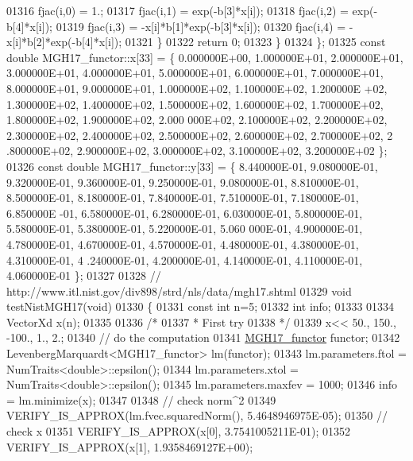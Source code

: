 \begin{DoxyCode}
01316             fjac(i,0) = 1.;
01317             fjac(i,1) = exp(-b[3]*x[i]);
01318             fjac(i,2) = exp(-b[4]*x[i]);
01319             fjac(i,3) = -x[i]*b[1]*exp(-b[3]*x[i]);
01320             fjac(i,4) = -x[i]*b[2]*exp(-b[4]*x[i]);
01321         \}
01322         \textcolor{keywordflow}{return} 0;
01323     \}
01324 \};
01325 \textcolor{keyword}{const} \textcolor{keywordtype}{double} MGH17\_functor::x[33] = \{ 0.000000E+00, 1.000000E+01, 2.000000E+01, 3.000000E+01, 4.000000E+01,
       5.000000E+01, 6.000000E+01, 7.000000E+01, 8.000000E+01, 9.000000E+01, 1.000000E+02, 1.100000E+02, 1.200000E
      +02, 1.300000E+02, 1.400000E+02, 1.500000E+02, 1.600000E+02, 1.700000E+02, 1.800000E+02, 1.900000E+02, 2.000
      000E+02, 2.100000E+02, 2.200000E+02, 2.300000E+02, 2.400000E+02, 2.500000E+02, 2.600000E+02, 2.700000E+02, 2
      .800000E+02, 2.900000E+02, 3.000000E+02, 3.100000E+02, 3.200000E+02 \};
01326 \textcolor{keyword}{const} \textcolor{keywordtype}{double} MGH17\_functor::y[33] = \{ 8.440000E-01, 9.080000E-01, 9.320000E-01, 9.360000E-01, 9.250000E-01,
       9.080000E-01, 8.810000E-01, 8.500000E-01, 8.180000E-01, 7.840000E-01, 7.510000E-01, 7.180000E-01, 6.850000E
      -01, 6.580000E-01, 6.280000E-01, 6.030000E-01, 5.800000E-01, 5.580000E-01, 5.380000E-01, 5.220000E-01, 5.060
      000E-01, 4.900000E-01, 4.780000E-01, 4.670000E-01, 4.570000E-01, 4.480000E-01, 4.380000E-01, 4.310000E-01, 4
      .240000E-01, 4.200000E-01, 4.140000E-01, 4.110000E-01, 4.060000E-01 \};
01327 
01328 \textcolor{comment}{// http://www.itl.nist.gov/div898/strd/nls/data/mgh17.shtml}
01329 \textcolor{keywordtype}{void} testNistMGH17(\textcolor{keywordtype}{void})
01330 \{
01331   \textcolor{keyword}{const} \textcolor{keywordtype}{int} n=5;
01332   \textcolor{keywordtype}{int} info;
01333 
01334   VectorXd x(n);
01335 
01336   \textcolor{comment}{/*}
01337 \textcolor{comment}{   * First try}
01338 \textcolor{comment}{   */}
01339   x<< 50., 150., -100., 1., 2.;
01340   \textcolor{comment}{// do the computation}
01341   \hyperlink{struct_m_g_h17__functor}{MGH17\_functor} functor;
01342   LevenbergMarquardt<MGH17\_functor> lm(functor);
01343   lm.parameters.ftol = NumTraits<double>::epsilon();
01344   lm.parameters.xtol = NumTraits<double>::epsilon();
01345   lm.parameters.maxfev = 1000;
01346   info = lm.minimize(x);
01347 
01348   \textcolor{comment}{// check norm^2}
01349   VERIFY\_IS\_APPROX(lm.fvec.squaredNorm(), 5.4648946975E-05);
01350   \textcolor{comment}{// check x}
01351   VERIFY\_IS\_APPROX(x[0], 3.7541005211E-01);
01352   VERIFY\_IS\_APPROX(x[1], 1.9358469127E+00);

\end{DoxyCode}
